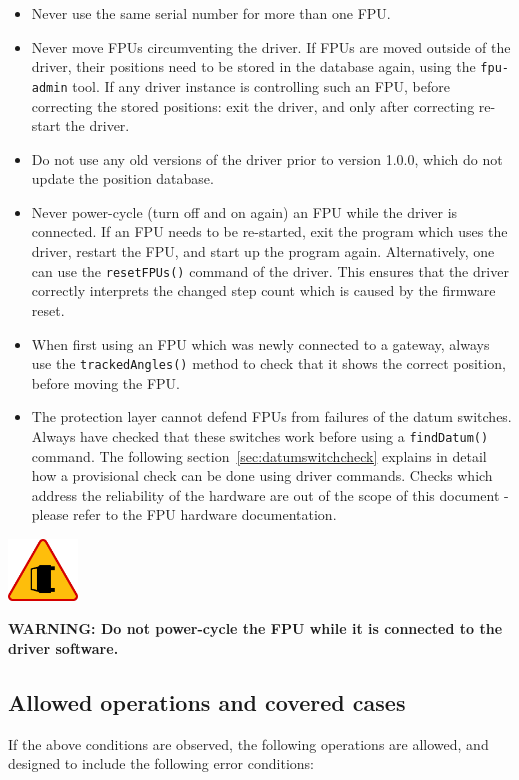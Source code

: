 \documentclass[11pt,a4paper]{scrartcl}
\newenvironment{warning}{\begin{framed}\includegraphics[width=5em]{accident-area-ahead.png}
}{\end{framed}}
\begin{document}
\begin{itemize}
  \item Never use the same serial number for more than one FPU.
  \item Never move FPUs circumventing the driver. If FPUs are moved
    outside of the driver, their positions need to be stored in the
    database again, using the \texttt{fpu-admin} tool. If any driver
    instance is controlling such an FPU, before correcting the stored
    positions: exit the driver, and only after correcting re-start the
    driver.
    
  \item Do not use any old versions of the driver prior to version
    1.0.0, which do not update the position database.
    
  \item Never power-cycle (turn off and on again) an FPU while the
    driver is connected. If an FPU needs to be re-started, exit the
    program which uses the driver, restart the FPU, and start up the
    program again.  Alternatively, one can use the
    \texttt{resetFPUs()} command of the driver. This ensures that the
    driver correctly interprets the changed step count which is caused
    by the firmware reset.
  \item When first using an FPU which was newly connected to a
    gateway, always use the \texttt{trackedAngles()} method to check
    that it shows the correct position, before moving the FPU.
  \item The protection layer cannot defend FPUs from failures of the
    datum switches. Always have checked that these switches work
    before using a \texttt{findDatum()} command. The following
    section~\ref{sec:datumswitchcheck} explains in detail how a
    provisional check can be done using driver commands. Checks which
    address the reliability of the hardware are out of the scope of
    this document - please refer to the FPU hardware documentation.
\end{itemize}

\begin{warning}
  \textbf{WARNING: Do not power-cycle the FPU while it is connected
    to the driver software.}
\end{warning}


\subsection{Allowed operations and covered cases}
If the above conditions are observed, the following operations are
allowed, and designed to include the following error conditions:
\end{document}
